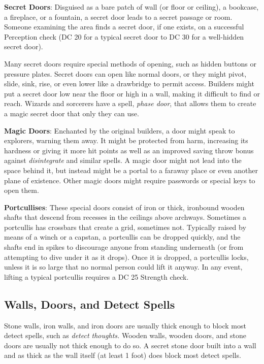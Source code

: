 \textbf{Secret Doors}: Disguised as a bare patch of wall (or floor or ceiling), a bookcase, a fireplace, or a fountain, a secret door leads to a secret passage or room. Someone examining the area finds a secret door, if one exists, on a successful Perception check (DC 20 for a typical secret door to DC 30 for a well-hidden secret door).
				
Many secret doors require special methods of opening, such as hidden buttons or pressure plates. Secret doors can open like normal doors, or they might pivot, slide, sink, rise, or even lower like a drawbridge to permit access. Builders might put a secret door low near the floor or high in a wall, making it difficult to find or reach. Wizards and sorcerers have a spell, \textit{phase door}, that allows them to create a magic secret door that only they can use.
				
\textbf{Magic Doors}: Enchanted by the original builders, a door might speak to explorers, warning them away. It might be protected from harm, increasing its hardness or giving it more hit points as well as an improved saving throw bonus against \textit{disintegrate }and similar spells. A magic door might not lead into the space behind it, but instead might be a portal to a faraway place or even another plane of existence. Other magic doors might require passwords or special keys to open them. 
				
\textbf{Portcullises}: These special doors consist of iron or thick, ironbound wooden shafts that descend from recesses in the ceilings above archways. Sometimes a portcullis has crossbars that create a grid, sometimes not. Typically raised by means of a winch or a capstan, a portcullis can be dropped quickly, and the shafts end in spikes to discourage anyone from standing underneath (or from attempting to dive under it as it drops). Once it is dropped, a portcullis locks, unless it is so large that no normal person could lift it anyway. In any event, lifting a typical portcullis requires a DC 25 Strength check.
				
\subsection{Walls, Doors, and Detect Spells}

				
Stone walls, iron walls, and iron doors are usually thick enough to block most detect spells, such as \textit{detect thoughts. }Wooden walls, wooden doors, and stone doors are usually not thick enough to do so. A secret stone door built into a wall and as thick as the wall itself (at least 1 foot) does block most detect spells.
				
